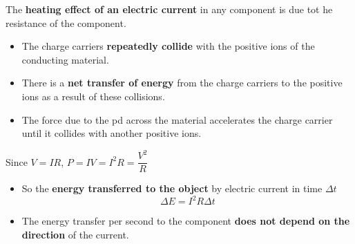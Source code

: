 The \textbf{heating effect of an electric current} in any component is due tot he resistance of the component. 
\begin{itemize}
    \item The charge carriers \textbf{repeatedly collide} with the positive ions of the conducting material.
    \item There is a \textbf{net transfer of energy} from the charge carriers to the positive ions as a result of these collisions.
    \item The force due to the pd across the material accelerates the charge carrier until it collides with another positive ions.
\end{itemize}

Since $V=IR$, $P=IV=I^2R=\dfrac{V^2}{R}$

\begin{itemize}
    \item So the \textbf{energy transferred to the object} by electric current in time $\Delta t$
        $$\Delta E=I^2R\Delta t$$
    \item The energy transfer per second to the component \textbf{does not depend on the direction} of the current.
\end{itemize}
